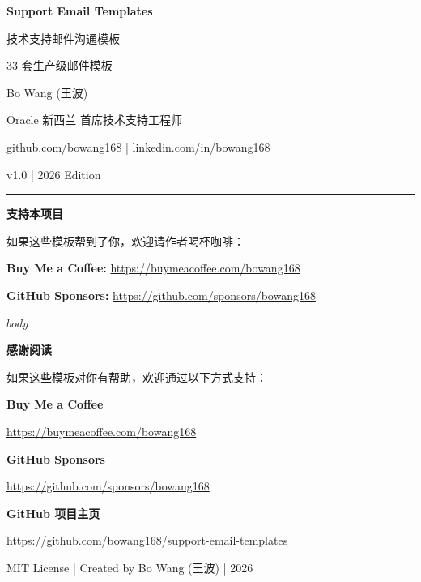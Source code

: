 \documentclass[11pt,a4paper,openany]{report}
\begin{document}
\thispagestyle{empty}
\begin{center}
\vspace*{3cm}
{\Huge\bfseries\color{chaptercolor} Support Email Templates}

\vspace{1cm}
{\Large 技术支持邮件沟通模板}

\vspace{0.5cm}
{\large 33 套生产级邮件模板}

\vspace{2.5cm}
{\Large Bo Wang (王波)}

\vspace{0.3cm}
{\normalsize Oracle 新西兰 首席技术支持工程师}

\vspace{0.2cm}
{\small github.com/bowang168 | linkedin.com/in/bowang168}

\vspace{2cm}
{\large v1.0 | 2026 Edition}

\vspace{1.5cm}
\hrule
\vspace{0.5cm}
{\normalsize\textbf{支持本项目}}

\vspace{0.3cm}
{\small 如果这些模板帮到了你，欢迎请作者喝杯咖啡：}

\vspace{0.2cm}
{\small \textcolor{linkcolor}{\textbf{Buy Me a Coffee:}} \url{https://buymeacoffee.com/bowang168}}

\vspace{0.1cm}
{\small \textcolor{linkcolor}{\textbf{GitHub Sponsors:}} \url{https://github.com/sponsors/bowang168}}
\end{center}
\cleardoublepage

\thispagestyle{empty}
\tableofcontents
\cleardoublepage

$body$

\cleardoublepage
\thispagestyle{empty}
\begin{center}
\vspace*{6cm}
{\Large\bfseries 感谢阅读}

\vspace{1cm}
{\normalsize 如果这些模板对你有帮助，欢迎通过以下方式支持：}

\vspace{1cm}
{\large \textcolor{linkcolor}{\textbf{Buy Me a Coffee}}}

{\normalsize \url{https://buymeacoffee.com/bowang168}}

\vspace{0.8cm}
{\large \textcolor{linkcolor}{\textbf{GitHub Sponsors}}}

{\normalsize \url{https://github.com/sponsors/bowang168}}

\vspace{0.8cm}
{\large \textcolor{linkcolor}{\textbf{GitHub 项目主页}}}

{\normalsize \url{https://github.com/bowang168/support-email-templates}}

\vspace{2cm}
{\small MIT License | Created by Bo Wang (王波) | 2026}
\end{center}
\end{document}
